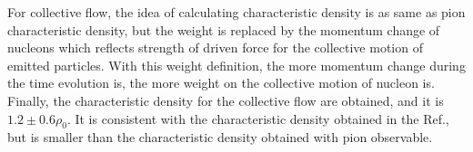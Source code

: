 \documentclass[reprint,aps,prc,twocolumn,superscriptaddress]{revtex4-1}
\begin{document}
For collective flow, the idea of calculating characteristic density is as same as pion characteristic density\cite{YYLiu2021PRC,Fevre2016NPA}, but the weight is replaced by the momentum change of nucleons which reflects strength of driven force for the collective motion of emitted particles. 
With this weight definition, the more momentum change during the time evolution is, the more weight on the collective motion of nucleon is. Finally, the characteristic density for the collective flow are obtained, and it is $1.2\pm 0.6\rho_0$. It is consistent with the characteristic density obtained in the Ref.\cite{Fevre2016NPA}, but is smaller than the characteristic density obtained with pion observable. 




\end{document}
